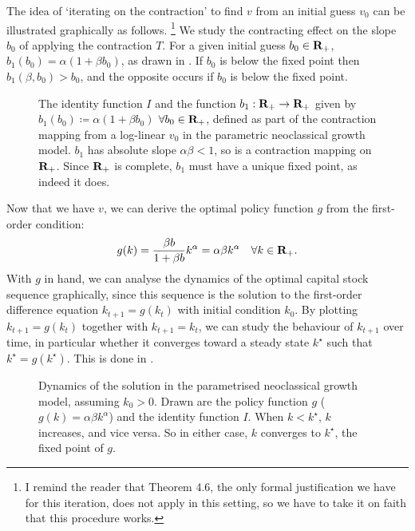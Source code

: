 \documentclass[11pt,letterpaper,reqno,oneside]{article}
\begin{document}
The idea of `iterating on the contraction' to find $v$ from an initial guess $v_0$ can be illustrated graphically as follows.%
	\footnote{I remind the reader that Theorem 4.6, the only formal justification we have for this iteration, does not apply in this setting, so we have to take it on faith that this procedure works.}
We study the contracting effect on the slope $b_0$ of applying the contraction $T$. For a given initial guess $b_0 \in \mathbf{R}_+$, $b_1(b_0) = \alpha( 1 + \beta b_0 )$, as drawn in . If $b_0$ is below the fixed point then $b_1(\beta,b_0) > b_0$, and the opposite occurs if $b_0$ is below the fixed point.
%
\begin{figure}
	\centering
	
	\caption{The identity function $I$ and the function $b_1 : \mathbf{R}_+ \to \mathbf{R}_+$ given by $b_1(b_0) \coloneqq \alpha ( 1 + \beta b_0 )$ $\forall b_0 \in \mathbf{R}_+$, defined as part of the contraction mapping from a log-linear $v_0$ in the parametric neoclassical growth model. $b_1$ has absolute slope $\alpha\beta < 1$, so is a contraction mapping on $\mathbf{R}_+$. Since $\mathbf{R}_+$ is complete, $b_1$ must have a unique fixed point, as indeed it does.}
	\label{fig:contraction_loglinear}
\end{figure}


Now that we have $v$, we can derive the optimal policy function $g$ from the first-order condition:
%
\begin{equation*}
	g(k) = \frac{\beta b}{1 + \beta b} k^\alpha 
	= \alpha \beta k^\alpha 
	\quad\forall k \in \mathbf{R}_+ .
\end{equation*}
%
With $g$ in hand, we can analyse the dynamics of the optimal capital stock sequence graphically, since this sequence is the solution to the first-order difference equation $k_{t+1} = g(k_t)$ with initial condition $k_0$. By plotting $k_{t+1} = g(k_t)$ together with $k_{t+1}=k_t$, we can study the behaviour of $k_{t+1}$ over time, in particular whether it converges toward a steady state $k^\star$ such that $k^\star = g(k^\star)$. This is done in .
%
\begin{figure}
	\centering
	
	\caption{Dynamics of the solution in the parametrised neoclassical growth model, assuming $k_0>0$. Drawn are the policy function $g$ ($g(k) = \alpha\beta k^\alpha$) and the identity function $I$. When $k < k^\star$, $k$ increases, and vice versa. So in either case, $k$ converges to $k^\star$, the fixed point of $g$.}
	\label{fig:neoclassical_parametric_dynamics}
\end{figure}
\end{document}

